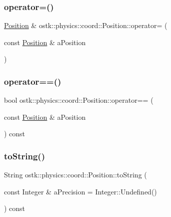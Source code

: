 \subsubsection{\texorpdfstring{operator=()}{operator=()}}
{\footnotesize\ttfamily \hyperlink{classostk_1_1physics_1_1coord_1_1_position}{Position} \& ostk\+::physics\+::coord\+::\+Position\+::operator= (\begin{DoxyParamCaption}\item[{const \hyperlink{classostk_1_1physics_1_1coord_1_1_position}{Position} \&}]{a\+Position }\end{DoxyParamCaption})}

\mbox{\label{classostk_1_1physics_1_1coord_1_1_position_a5384658411f001cf57747382ab4fd461}} 
\subsubsection{\texorpdfstring{operator==()}{operator==()}}
{\footnotesize\ttfamily bool ostk\+::physics\+::coord\+::\+Position\+::operator== (\begin{DoxyParamCaption}\item[{const \hyperlink{classostk_1_1physics_1_1coord_1_1_position}{Position} \&}]{a\+Position }\end{DoxyParamCaption}) const}

\mbox{\label{classostk_1_1physics_1_1coord_1_1_position_a6aa81e5bdaa16f35b1884ff8bc1238dc}} 
\subsubsection{\texorpdfstring{to\+String()}{toString()}}
{\footnotesize\ttfamily String ostk\+::physics\+::coord\+::\+Position\+::to\+String (\begin{DoxyParamCaption}\item[{const Integer \&}]{a\+Precision = {\ttfamily Integer\+:\+:Undefined()} }\end{DoxyParamCaption}) const}

